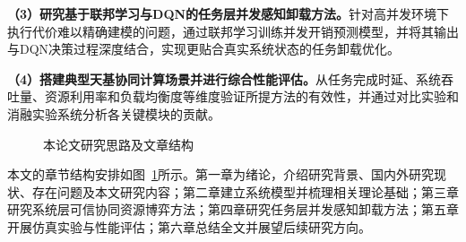 \textbf{（3）研究基于联邦学习与DQN的任务层并发感知卸载方法。}针对高并发环境下执行代价难以精确建模的问题，通过联邦学习训练并发开销预测模型，并将其输出与DQN决策过程深度结合，实现更贴合真实系统状态的任务卸载优化。

\textbf{（4）搭建典型天基协同计算场景并进行综合性能评估。}从任务完成时延、系统吞吐量、资源利用率和负载均衡度等维度验证所提方法的有效性，并通过对比实验和消融实验系统分析各关键模块的贡献。

\begin{figure}[htbp]
  \centering
  \caption{本论文研究思路及文章结构}
  \label{fig:structure}
\end{figure}

本文的章节结构安排如图~\ref{fig:structure}所示。第一章为绪论，介绍研究背景、国内外研究现状、存在问题及本文研究内容；第二章建立系统模型并梳理相关理论基础；第三章研究系统层可信协同资源博弈方法；第四章研究任务层并发感知卸载方法；第五章开展仿真实验与性能评估；第六章总结全文并展望后续研究方向。

